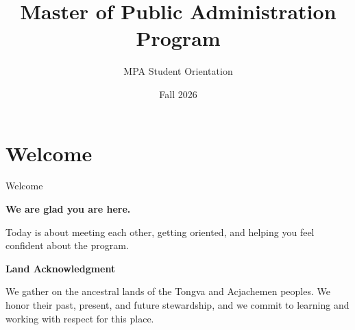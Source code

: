 \documentclass[10pt,aspectratio=169]{beamer}
\title{Master of Public Administration Program}
\subtitle{MPA Student Orientation}
\date{Fall 2026}
\begin{document}

\maketitle

\section{\textcolor{titanorange}{Welcome}}
\begin{frame}{Welcome}
\begin{Large}
  \textbf{We are glad you are here.}\par\vspace{0.5em}
  Today is about meeting each other, getting oriented, and helping you feel confident about the program.\par\vspace{0.75em}

  \textbf{Land Acknowledgment}\par
  We gather on the ancestral lands of the Tongva and Acjachemen peoples. We honor their past, present, and future stewardship, and we commit to learning and working with respect for this place.
\end{Large}
\end{frame}
\end{document}
